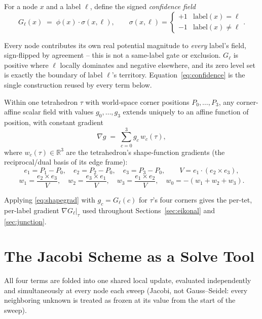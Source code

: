 \documentclass[11pt]{article}
\newcommand{\grad}{\nabla}
\newcommand{\R}{\mathbb{R}}
\begin{document}
For a node $x$ and a label $\ell$, define the signed \emph{confidence
field}
\begin{equation}
  G_\ell(x) \;=\; \phi(x)\cdot\sigma(x,\ell), \qquad
  \sigma(x,\ell) = \begin{cases} +1 & \text{label}(x) = \ell \\ -1 &
  \text{label}(x) \ne \ell \end{cases}.
  \label{eq:confidence}
\end{equation}

Every node contributes its own real potential magnitude to \emph{every}
label's field, sign-flipped by agreement -- this is not a same-label
gate or exclusion. $G_\ell$ is positive where $\ell$ locally dominates and
negative elsewhere, and its zero level set is exactly the boundary of
label $\ell$'s territory. Equation~\eqref{eq:confidence} is the single
construction reused by every term below.

Within one tetrahedron $\tau$ with world-space corner positions
$P_0,\dots,P_3$, any corner-affine scalar field with values $g_0,\dots,g_3$
extends uniquely to an affine function of position, with constant gradient
\begin{equation}
  \grad g \;=\; \sum_{c=0}^{3} g_c\, w_c(\tau),
  \label{eq:shapegrad}
\end{equation}
where $w_c(\tau) \in \R^3$ are the tetrahedron's shape-function gradients
(the reciprocal/dual basis of its edge frame):
\begin{equation}
  e_1 = P_1{-}P_0,\quad e_2 = P_2{-}P_0,\quad e_3 = P_3{-}P_0,\qquad
  V = e_1\cdot(e_2\times e_3),
\end{equation}
\begin{equation}
  w_1 = \frac{e_2\times e_3}{V},\quad
  w_2 = \frac{e_3\times e_1}{V},\quad
  w_3 = \frac{e_1\times e_2}{V},\quad
  w_0 = -(w_1+w_2+w_3).
  \label{eq:dualbasis}
\end{equation}

Applying \eqref{eq:shapegrad} with $g_c = G_\ell(c)$ for $\tau$'s four
corners gives the per-tet, per-label gradient $\grad G_\ell|_\tau$ used
throughout Sections~\ref{sec:eikonal} and \ref{sec:junction}.

\section{The Jacobi Scheme as a Solve Tool}
\label{sec:jacobi}

All four terms are folded into one shared local update, evaluated
independently and simultaneously at every node each sweep (Jacobi, not
Gauss--Seidel: every neighboring unknown is treated as frozen at its
value from the start of the sweep).
\end{document}
